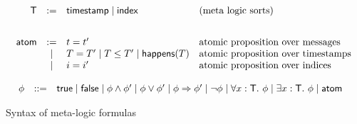 \begin{figure}[h]
  \[
  \begin{array}{c}
   \begin{array}{rcll}
    \textsf{T} &  := & \textsf{timestamp} \mid \textsf{index} & \text{(meta logic sorts)} \\
    \\[2ex]
   \textsf{atom} & := & t=t'
 & \text{atomic proposition over messages } \\
  &\mid & T=T' \mid T \leq T' \mid \textsf{happens}(T) &  \text{atomic proposition
  over timestamps } \\
  &\mid & i=i'  &  \text{atomic proposition
    over indices } \\
    \end{array}
\\
\\
     \begin{array}{rcll}
    \phi & ::= &  \textsf{true} \mid \textsf{false} \mid \phi \wedge \phi' \mid  \phi
    \vee \phi' \mid   \phi \Rightarrow \phi'\mid \neg \phi \mid
    \forall x : \textsf{T}.\ \phi \mid \exists x:\textsf{T}.\ \phi \mid \textsf{atom} &
    \end{array}

\end{array}
    \]
    \caption{Syntax of meta-logic formulas}\label{fig:formulas}
\end{figure}
